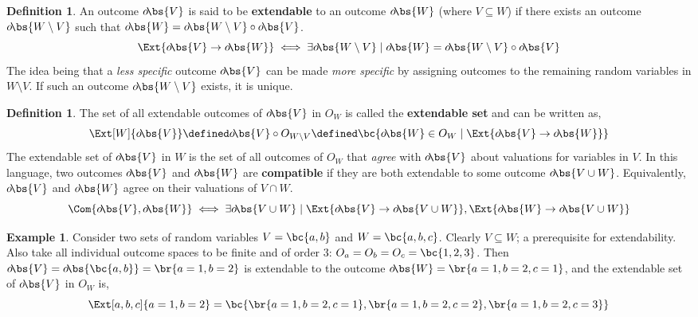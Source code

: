 \documentclass[aps, 10pt, english, twoside, pra, nofootinbib, longbibliography]{revtex4-1}
\theoremstyle{plain}
\theoremstyle{definition}
\newtheorem{definition}[theorem]{Definition}
\newtheorem{example}[theorem]{Example}
\theoremstyle{remark}
\newcommand{\valprod}{\circ}
\newcommand{\term}[1]{\textcolor{Mahogany}{\textbf{#1}}}
\newcommand{\outc}[1]{o\!\bs{#1}}
\begin{document}
    \begin{definition}
        \label{def:extendable}
        An outcome $\outc{V}$ is said to be \term{extendable} to an outcome $\outc{W}$ (where $V \subseteq W$) if there exists an outcome $\outc{W\setminus V}$ such that $\outc{W} = \outc{W\setminus V} \valprod \outc{V}$.
        \[ \Ext{\outc{V} \to \outc{W}} \iff \exists \outc{W\setminus V} \mid \outc{W} = \outc{W\setminus V} \valprod \outc{V} \]
        The idea being that a \textit{less specific} outcome $\outc{V}$ can be made \textit{more specific} by assigning outcomes to the remaining random variables in $W \setminus V$. If such an outcome $\outc{W\setminus V}$ exists, it is unique.
    \end{definition}

    \begin{definition}
        The set of all extendable outcomes of $\outc{V}$ in $O_{W}$ is called the \term{extendable set} and can be written as,
        \[ \Ext[W]{\outc{V}} \defined \outc{V} \valprod O_{W\setminus V} \defined \bc{\outc{W} \in O_{W} \mid \Ext{\outc{V} \to \outc{W}}} \]
        The extendable set of $\outc{V}$ in $W$ is the set of all outcomes of $O_W$ that \textit{agree} with $\outc{V}$ about valuations for variables in $V$. In this language, two outcomes $\outc{V}$ and $\outc{W}$ are \term{compatible} if they are both extendable to some outcome $\outc{V \cup W}$. Equivalently, $\outc{V}$ and $\outc{W}$ agree on their valuations of $V \cap W$.
        \[ \Com{\outc{V}, \outc{W}} \iff \exists \outc{V \cup W} \mid \Ext{\outc{V} \to \outc{V \cup W}}, \Ext{\outc{W} \to \outc{V \cup W}} \]
    \end{definition}

    \begin{example}
        Consider two sets of random variables $V = \bc{a, b}$ and $W = \bc{a, b, c}$. Clearly $V \subseteq W$; a prerequisite for extendability. Also take all individual outcome spaces to be finite and of order 3: $O_a = O_b = O_c = \bc{1,2,3}$. Then $\outc{V} = \outc{\bc{a,b}} = \br{a = 1, b = 2}$ is extendable to the outcome $\outc{W} = \br{a = 1, b = 2, c = 1}$, and the extendable set of $\outc{V}$ in $O_{W}$ is,
        \[ \Ext[a,b,c]{a = 1, b = 2} = \bc{\br{a = 1, b = 2, c = 1}, \br{a = 1, b = 2, c = 2}, \br{a = 1, b = 2, c = 3}} \]
    \end{example}

\end{document}
